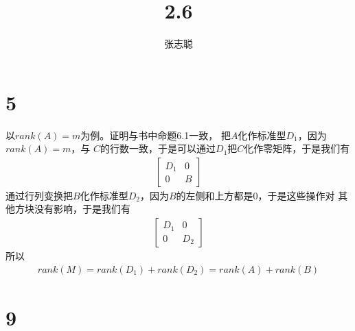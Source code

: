 \documentclass{article}
\begin{document}
\title{2.6}
\author{张志聪}
\maketitle

\section*{5}

以$rank(A) = m$为例。证明与书中命题6.1一致，
把$A$化作标准型$D_1$，因为$rank(A) = m$，与
$C$的行数一致，于是可以通过$D_1$把$C$化作零矩阵，于是我们有
\begin{align*}
  \begin{bmatrix}
    D_1 & 0 \\
    0   & B
  \end{bmatrix}
\end{align*}
通过行列变换把$B$化作标准型$D_2$，因为$B$的左侧和上方都是$0$，于是这些操作对
其他方块没有影响，于是我们有
\begin{align*}
  \begin{bmatrix}
    D_1 & 0   \\
    0   & D_2
  \end{bmatrix}
\end{align*}
所以
\begin{align*}
  rank(M) = rank(D_1) + rank(D_2) = rank(A) + rank(B)
\end{align*}

\section*{9}
\end{document}
